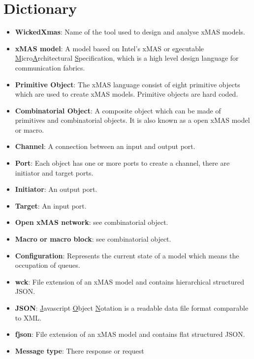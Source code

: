 \documentclass[a4paper,11pt,final]{article}
\begin{document}
\section{Dictionary} 
\begin{itemize}
\item \textbf{WickedXmas}: Name of the tool used to design and analyse xMAS models.
\item \textbf{xMAS model}: A model based on Intel's xMAS or e\underline{x}ecutable \underline{M}icro\underline{A}rchitectural \underline{S}pecification, which is a high level design language for communication fabrics. 
\item \textbf{Primitive Object}: The xMAS language consist of eight primitive objects which are used to create xMAS models. Primitive objects are hard coded.
\item \textbf{Combinatorial Object}: A composite object which can be made of primitives and combinatorial objects. It is also known as a open xMAS model or macro.
\item \textbf{Channel}: A connection between an input and output port.
\item \textbf{Port}: Each object has one or more ports to create a channel, there are initiator and target ports.
\item \textbf{Initiator}: An output port.
\item \textbf{Target}: An input port.
\item \textbf{Open xMAS network}: see combinatorial object.
\item \textbf{Macro or macro block}: see combinatorial object.
\item \textbf{Configuration}: Represents the current state of a model which means the occupation of queues.
\item \textbf{wck}: File extension of an xMAS model and contains hierarchical structured JSON.
\item \textbf{JSON}: \underline{J}avascript \underline{O}bject \underline{N}otation is a readable data file format comparable to XML.
\item \textbf{fjson}: File extension of an xMAS model and contains flat structured JSON.
\item \textbf{Message type}: There response or request 

\end{itemize}
\end{document}
